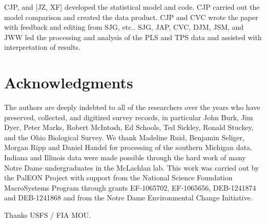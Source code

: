 \documentclass[12pt]{article}\usepackage[]{graphicx}\usepackage[]{color}
\begin{document}
CJP, and {[}JZ, XF{]} developed the statistical model and code. CJP
carried out the model comparison and created the data product. CJP
and CVC wrote the paper with feedback and editing from SJG, etc..
SJG, JAP, CVC, DJM, JSM, and JWW led the processing and analysis of
the PLS and TPS data and assisted with interpretation of results. 


\section*{Acknowledgments}

The authors are deeply indebted to all of the researchers over the
years who have preserved, collected, and digitized survey records,
in particular John Burk, Jim Dyer, Peter Marks, Robert McIntosh, Ed
Schools, Ted Sickley, Ronald Stuckey, and the Ohio Biological Survey.
We thank Madeline Ruid, Benjamin Seliger, Morgan Ripp and Daniel Handel
for processing of the southern Michigan data. Indiana and Illinois
data were made possible through the hard work of many Notre Dame undergraduates
in the McLachlan lab. This work was carried out by the PalEON Project
with support from the National Science Foundation MacroSystems Program
through grants EF-1065702, EF-1065656, DEB-1241874 and DEB-1241868
and from the Notre Dame Environmental Change Initiative. 

Thanks USFS / FIA MOU.




\end{document}
